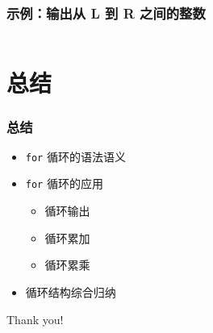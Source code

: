 \begin{frame}[fragile]
    \frametitle{示例：输出从 L 到 R 之间的整数}

    \begin{columns}[T]

        

        
    \end{columns}
\end{frame}


\section{总结}

\begin{frame}[fragile]
    \frametitle{总结}

    \begin{itemize}
        \item \lstinline|for| 循环的语法语义

        \item \lstinline|for| 循环的应用

            \begin{itemize}
                \item 循环输出
                \item 循环累加
                \item 循环累乘
            \end{itemize}

        \item 循环结构综合归纳
    \end{itemize}
\end{frame}

\begin{frame}
    \begin{center}
        {\Huge Thank you!}
    \end{center}
\end{frame}



